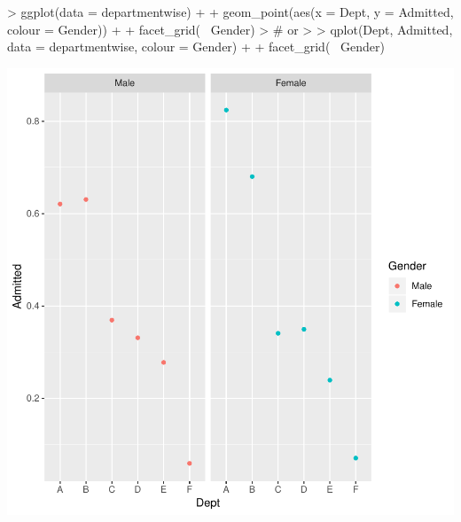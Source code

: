\documentclass[12pt,letterpaper,final]{article}
\begin{document}
\begin{Schunk}
\begin{Sinput}
> ggplot(data = departmentwise) +
+   geom_point(aes(x = Dept, y = Admitted, colour = Gender)) +
+   facet_grid(~ Gender)
> # or
> 
> qplot(Dept, Admitted, data = departmentwise, colour = Gender) +
+   facet_grid(~ Gender)
\end{Sinput}
\end{Schunk}
\includegraphics{lect_main-033}
\end{document}
